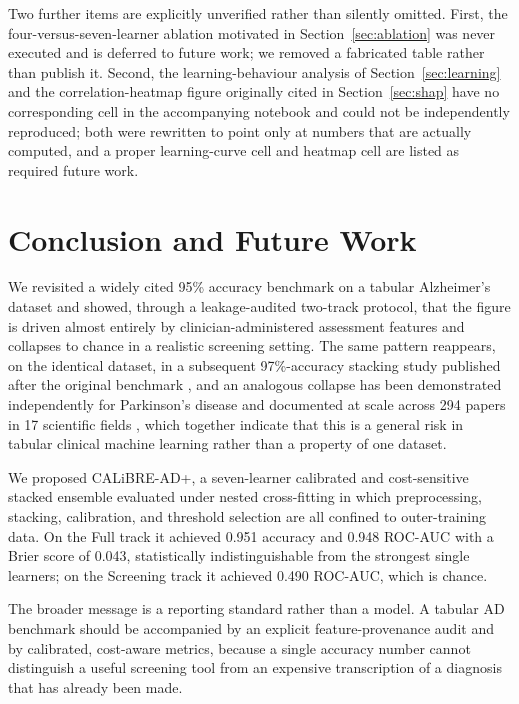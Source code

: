 \documentclass[conference]{IEEEtran}
\begin{document}
Two further items are explicitly unverified rather than silently omitted. First, the four-versus-seven-learner ablation motivated in Section~\ref{sec:ablation} was never executed and is deferred to future work; we removed a fabricated table rather than publish it. Second, the learning-behaviour analysis of Section~\ref{sec:learning} and the correlation-heatmap figure originally cited in Section~\ref{sec:shap} have no corresponding cell in the accompanying notebook and could not be independently reproduced; both were rewritten to point only at numbers that are actually computed, and a proper learning-curve cell and heatmap cell are listed as required future work.

\section{Conclusion and Future Work}
\label{sec:conclusion}
We revisited a widely cited 95\% accuracy benchmark on a tabular Alzheimer's dataset and showed, through a leakage-audited two-track protocol, that the figure is driven almost entirely by clinician-administered assessment features and collapses to chance in a realistic screening setting. The same pattern reappears, on the identical dataset, in a subsequent 97\%-accuracy stacking study published after the original benchmark \cite{b37}, and an analogous collapse has been demonstrated independently for Parkinson's disease \cite{b42} and documented at scale across 294 papers in 17 scientific fields \cite{b40}, which together indicate that this is a general risk in tabular clinical machine learning rather than a property of one dataset.

We proposed CALiBRE-AD+, a seven-learner calibrated and cost-sensitive stacked ensemble evaluated under nested cross-fitting in which preprocessing, stacking, calibration, and threshold selection are all confined to outer-training data. On the Full track it achieved 0.951 accuracy and 0.948 ROC-AUC with a Brier score of 0.043, statistically indistinguishable from the strongest single learners; on the Screening track it achieved 0.490 ROC-AUC, which is chance.

The broader message is a reporting standard rather than a model. A tabular AD benchmark should be accompanied by an explicit feature-provenance audit and by calibrated, cost-aware metrics, because a single accuracy number cannot distinguish a useful screening tool from an expensive transcription of a diagnosis that has already been made.
\end{document}
